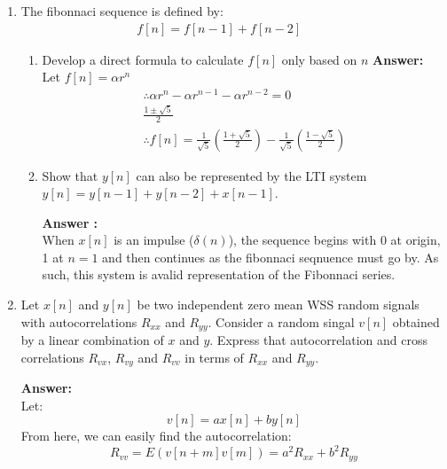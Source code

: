 \documentclass{article}
\begin{document}
\begin{enumerate}
\begin{align}
		\end{align}		
		\textbf{Answer: } \\
		Cross correlation is given by
		\begin{align}
			r_{xy} = \sum_{n = -\infty}^{\infty} x[n] y[n-l] \forall l
		\end{align}
		As such, for the values of $l$ as 0, 1 and -1:
		\begin{align}
			r_{xy}(0) = 2 + 1 + 6 - 14 + 4 + 2 + 6 = 7 \\
			r_{xy}(1) =-1 - 3 + 14 - 2 + 8 - 3 = 13 \\
			r_{xy}(-1) = -2 - 2 - 6 + 28 + 1 -4 - 14 = 0
		\end{align}
		You may follow the same method for the remaineder of the values of $l$.
		\item The fibonnaci sequence is defined by:
			\begin{align}
				f[n] = f[n-1] + f[n-2] \hspace{1cm}
			\end{align}
			\begin{enumerate}
				\item Develop a direct formula to calculate $f[n]$ only based on $n$
					\textbf{Answer: }\\
					Let $f[n] = \alpha r^n$
					\begin{align}
						\therefore \alpha r^n - \alpha r^{n-1} - \alpha r^{n-2} = 0\\
						\frac{1 \pm \sqrt{5}}{2} \\
						\therefore f[n] = \frac{1}{\sqrt{5}} \left(\frac{1 + \sqrt{5}}{2}\right) - \frac{1}{\sqrt{5}} \left(\frac{1 - \sqrt{5}}{2}\right)
					\end{align}
				\item Show that $y[n]$ can also be represented by the LTI system $y[n] = y[n-1] + y[n-2] + x[n-1]$.

					\textbf{Answer :}\\ 
					When $x[n]$ is an impulse ($\delta (n)$), the sequence begins with 0 at origin, 1 at $n = 1$ and then continues as the fibonnaci seqnuence must go by. As such, this system is  avalid representation of the Fibonnaci series.
			\end{enumerate}
		\item Let $x[n]$ and $y[n]$ be two independent zero mean WSS random signals with autocorrelations $R_{xx}$ and $R_{yy}$. Consider a random singal $v[n]$ obtained by a linear combination of $x$ and $y$. Express that autocorrelation and cross correlations $R_{vx}$, $R_{vy}$ and $R_{vv}$ in terms of $R_{xx}$ and $R_{yy}$.

			\textbf{Answer: }\\

			Let: 
			\begin{equation}
				v[n] = ax[n] + by[n]
			\end{equation}
			From here, we can easily find the autocorrelation:
			\begin{equation}
				R_{vv} = E(v[n+m]v[m]) = a^2R_{xx} + b^2R_{yy}
			\end{equation}
			
	\end{enumerate}
	
\end{document}
